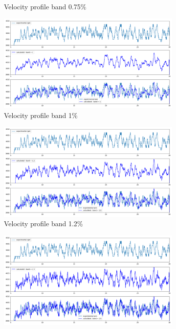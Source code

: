 \documentclass[10pt,fleqn,a4paper,twoside]{article}
\begin{document}
\begin{figure}
\begin{subfigure}{0.4\textwidth}
            \caption{Velocity profile band 0.75\%}
            \label{fig:third}
        \end{subfigure}
        \centering
        \hfill
        \begin{subfigure}{0.4\textwidth}
            \includegraphics[width=\textwidth]{Figures/rpm_analysis_mic8_band_1.png}
            \caption{Velocity profile band 1\%}
            \label{fig:fourth}
        \end{subfigure}
        \centering
        \hfill
        \begin{subfigure}{0.4\textwidth}
            \includegraphics[width=\textwidth]{Figures/rpm_analysis_mic8_band_1.2.png}
            \caption{Velocity profile band 1.2\%}
            \label{fig:fifth}
        \end{subfigure}
        \centering
        \hfill
        \begin{subfigure}{0.4\textwidth}
            \includegraphics[width=\textwidth]{Figures/rpm_analysis_mic8_band_1.5.png}

\end{subfigure}
\end{figure}
\end{document}
